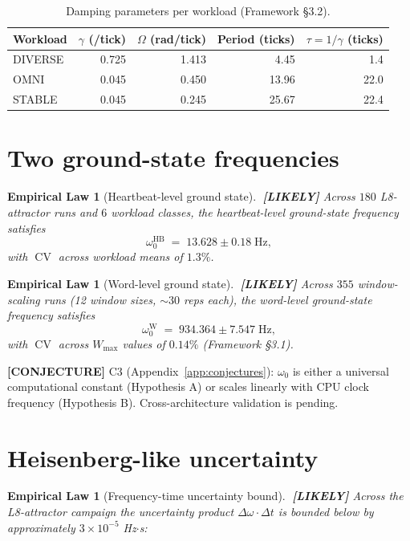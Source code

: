 \documentclass[11pt,letterpaper,openany]{book}
\theoremstyle{definition}
\theoremstyle{plain}
\newtheorem{empiricallaw}[definition]{Empirical Law}
\newcommand{\likely}{\textcolor{blue!60!black}{\textbf{[LIKELY]}}\xspace}
\newcommand{\conjecture}{\textcolor{red!60!black}{\textbf{[CONJECTURE]}}\xspace}
\newcommand{\Wmax}{W_{\mathrm{max}}}
\newcommand{\CV}{\operatorname{CV}}
\begin{document}
\begin{table}[H]
  \centering\small
  \begin{tabular}{l r r r r}
    \toprule
    Workload  & $\gamma$ (/tick) & $\Omega$ (rad/tick) & Period (ticks) & $\tau = 1/\gamma$ (ticks) \\
    \midrule
    DIVERSE   & 0.725 & 1.413 & 4.45  & 1.4  \\
    OMNI      & 0.045 & 0.450 & 13.96 & 22.0 \\
    STABLE    & 0.045 & 0.245 & 25.67 & 22.4 \\
    \bottomrule
  \end{tabular}
  \caption{Damping parameters per workload (Framework \S3.2).}
\end{table}

\section{Two ground-state frequencies}

\begin{empiricallaw}[Heartbeat-level ground state]\label{law:omega0-hb}
$\;$\likely
Across $180$ L8-attractor runs and $6$ workload classes,
the heartbeat-level ground-state frequency satisfies
\[
  \omega_0^{\mathrm{HB}} \;=\; 13.628 \pm 0.18\;\text{Hz},
\]
with $\CV$ across workload means of $1.3\%$.
\end{empiricallaw}

\begin{empiricallaw}[Word-level ground state]\label{law:omega0-word}
$\;$\likely
Across $355$ window-scaling runs (12 window sizes, ${\sim}30$ reps each),
the word-level ground-state frequency satisfies
\[
  \omega_0^{\mathrm{W}} \;=\; 934.364 \pm 7.547\;\text{Hz},
\]
with $\CV$ across $\Wmax$ values of $0.14\%$ (Framework \S3.1).
\end{empiricallaw}

\conjecture C3 (Appendix~\ref{app:conjectures}): $\omega_0$ is either a
universal computational constant (Hypothesis A) or scales linearly with
CPU clock frequency (Hypothesis B). Cross-architecture validation is
pending.

\section{Heisenberg-like uncertainty}

\begin{empiricallaw}[Frequency-time uncertainty bound]\label{law:uncertainty}
$\;$\likely
Across the L8-attractor campaign the uncertainty product
$\Delta\omega \cdot \Delta t$ is bounded below by approximately
$3\times 10^{-5}$ Hz$\cdot$s:
\end{empiricallaw}
\end{document}
